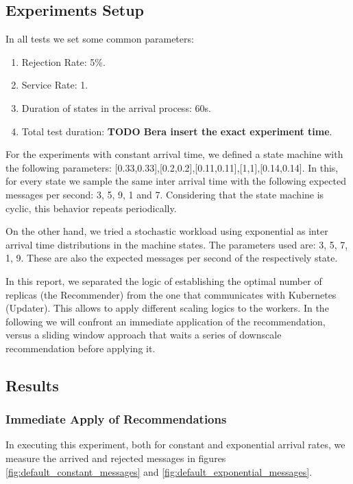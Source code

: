 \subsection{Experiments Setup}
In all tests we set some common parameters:
\begin{enumerate}
    \item Rejection Rate: 5\%.
    \item Service Rate: 1.
    \item Duration of states in the arrival process: 60s.
    \item Total test duration: \textbf{TODO Bera insert the exact experiment time}.
\end{enumerate}

For the experiments with constant arrival time, we defined a state machine with the following parameters: [0.33,0.33],[0.2,0.2],[0.11,0.11],[1,1],[0.14,0.14]. In this, for every state we sample the same inter arrival time with the following expected messages per second: 3, 5, 9, 1 and 7. Considering that the state machine is cyclic, this behavior repeats periodically.

On the other hand, we tried a stochastic workload using exponential as inter arrival time distributions in the machine states. The parameters used are: 3, 5, 7, 1, 9. These are also the expected messages per second of the respectively state.

In this report, we separated the logic of establishing the optimal number of replicas (the Recommender) from the one that communicates with Kubernetes (Updater). This allows to apply different scaling logics to the workers. In the following we will confront an immediate application of the recommendation, versus a sliding window approach that waits a series of downscale recommendation before applying it.

\subsection{Results}
\subsubsection{Immediate Apply of Recommendations}

In executing this experiment, both for constant and exponential arrival rates, we measure the arrived and rejected messages in figures \ref{fig:default_constant_messages} and \ref{fig:default_exponential_messages}.

